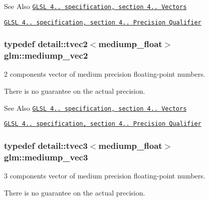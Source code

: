 \begin{DoxySeeAlso}{See Also}
\href{http://www.opengl.org/registry/doc/GLSLangSpec.4.20.8.pdf}{\tt G\-L\-S\-L 4.. specification, section 4.. Vectors} 

\href{http://www.opengl.org/registry/doc/GLSLangSpec.4.20.8.pdf}{\tt G\-L\-S\-L 4.. specification, section 4.. Precision Qualifier} 
\end{DoxySeeAlso}
\hypertarget{group__core__precision_gaa19e624188c7908ba28b9ef829e076f2}{
\subsubsection[{mediump\-\_\-vec2}]{\setlength{\rightskip}{0pt plus 5cm}typedef detail\-::tvec2$<$mediump\-\_\-float$>$ {\bf glm\-::mediump\-\_\-vec2}}}\label{group__core__precision_gaa19e624188c7908ba28b9ef829e076f2}


2 components vector of medium precision floating-\/point numbers. 

There is no guarantee on the actual precision.

\begin{DoxySeeAlso}{See Also}
\href{http://www.opengl.org/registry/doc/GLSLangSpec.4.20.8.pdf}{\tt G\-L\-S\-L 4.. specification, section 4.. Vectors} 

\href{http://www.opengl.org/registry/doc/GLSLangSpec.4.20.8.pdf}{\tt G\-L\-S\-L 4.. specification, section 4.. Precision Qualifier} 
\end{DoxySeeAlso}
\hypertarget{group__core__precision_gafab50a7800793f88befe5d2a0120c65b}{
\subsubsection[{mediump\-\_\-vec3}]{\setlength{\rightskip}{0pt plus 5cm}typedef detail\-::tvec3$<$mediump\-\_\-float$>$ {\bf glm\-::mediump\-\_\-vec3}}}\label{group__core__precision_gafab50a7800793f88befe5d2a0120c65b}


3 components vector of medium precision floating-\/point numbers. 

There is no guarantee on the actual precision.

